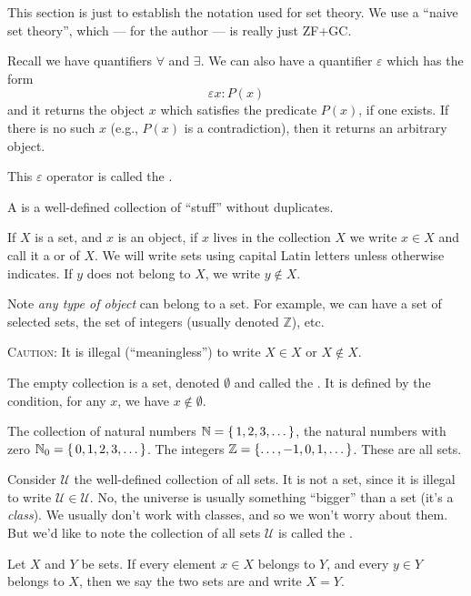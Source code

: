 This section is just to establish the notation used for set theory.
We use a ``naive set theory'', which --- for the author --- is really
just ZF+GC. 

Recall we have quantifiers $\forall$ and $\exists$. We can also have a
quantifier $\varepsilon$ which has the form
\begin{equation}
\varepsilon x : P(x)
\end{equation}
and it returns the object $x$ which satisfies the predicate $P(x)$, if
one exists. If there is no such $x$ (e.g., $P(x)$ is a contradiction),
then it returns an arbitrary object.

This $\varepsilon$ operator is called the . 

 A  is a well-defined collection of ``stuff''
without duplicates.

If $X$ is a set, and $x$ is an object, if $x$ lives in the collection
$X$ we write $x\in X$ and call it a  or 
of $X$. We will write sets using capital Latin letters unless otherwise
indicates. If $y$ does not belong to $X$, we write $y\notin X$.

Note \emph{any type of object} can belong to a set. For example, we can
have a set of selected sets, the set of integers (usually denoted
$\mathbb{Z}$), etc.

\textsc{Caution}: It is illegal (``meaningless'') to write $X\in X$ or $X\notin X$. 

 The empty collection is a set, denoted $\emptyset$ and
called the . It is defined by the condition, for any
$x$, we have $x\notin \emptyset$.

The collection of natural numbers $\mathbb{N}=\{\,1,2,3,\dots\,\}$, the natural
numbers with zero $\mathbb{N}_{0}=\{\,0,1,2,3,\dots\,\}$. The integers
$\mathbb{Z}=\{\dots,-1,0,1,\dots\,\}$. These are all sets.

Consider $\mathcal{U}$ the well-defined collection of all sets. It is
not a set, since it is illegal to write $\mathcal{U}\in\mathcal{U}$. No,
the universe is usually something ``bigger'' than a set (it's
a \emph{class}). We usually don't work with classes, and so we won't
worry about them. But we'd like to note the collection of all sets
$\mathcal{U}$ is called the .

Let $X$ and $Y$ be sets. If every element $x\in X$ belongs to $Y$, and
every $y\in Y$ belongs to $X$, then we say the two sets are
 and write $X=Y$.

